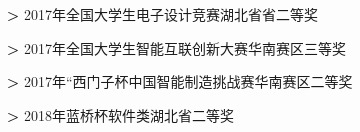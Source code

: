 %
%


\begin{itemize}
 \item[\textbf{>}] 2017年全国大学生电子设计竞赛湖北省省二等奖
 \item[\textbf{>}] 2017年全国大学生智能互联创新大赛华南赛区三等奖
 \item[\textbf{>}] 2017年“西门子杯中国智能制造挑战赛华南赛区二等奖
 \item[\textbf{>}] 2018年蓝桥杯软件类湖北省二等奖
\end{itemize}


